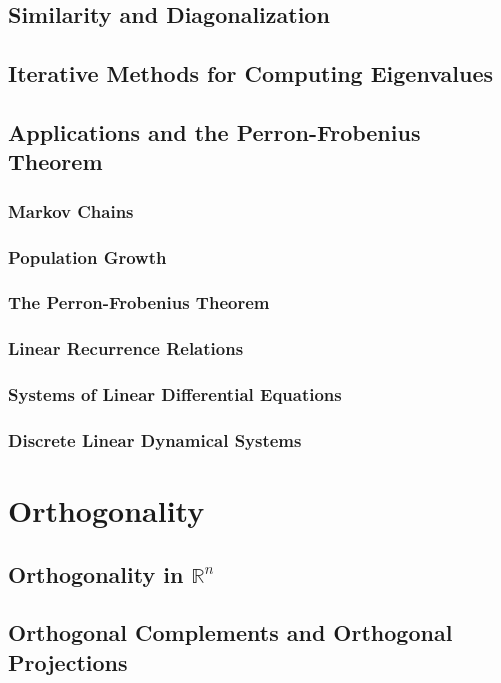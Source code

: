 \documentclass{article}
\begin{document}
	\subsection{Similarity and Diagonalization}
	
	\subsection{Iterative Methods for Computing Eigenvalues}
	
	\subsection{Applications and the Perron-Frobenius Theorem}
	
		\subsubsection{Markov Chains}
		\subsubsection{Population Growth}
		\subsubsection{The Perron-Frobenius Theorem}
		\subsubsection{Linear Recurrence Relations}
		\subsubsection{Systems of Linear Differential Equations}
		\subsubsection{Discrete Linear Dynamical Systems}

\clearpage	
\section{Orthogonality} %

	\subsection{Orthogonality in $\mathbb{R}^n$}
	
	\subsection{Orthogonal Complements and Orthogonal Projections}
	
\end{document}
